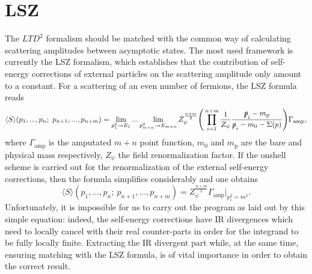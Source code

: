 \documentclass[11pt]{article}
\begin{document}
\section{LSZ}

The $LTD^2$ formalism should be matched with the common way of calculating scattering amplitudes between asymptotic states. The most used framework is currently the LSZ formalism, which establishes that the contribution of self-energy corrections of external particles on the scattering amplitude only amount to a constant. For a scattering of an even number of fermions, the LSZ formula reads
\begin{equation}
\langle S \rangle(p_1,...,p_n; \ p_{n+1},...,p_{n+m})=\lim_{p_1^0\rightarrow E_1}...\lim_{p_{m+n}^0\rightarrow E_{m+n}} Z_\psi^{\frac{n+m}{2}}\Bigg(\prod_{i=1}^{n+m}\frac{1}{Z_\psi}\frac{\slashed{p}_i -m_\text{p}}{\slashed{p}_i -m_0-\Sigma(p)}\Bigg)\Gamma_{\text{amp}},
\end{equation}
where $\Gamma_{\text{amp}}$ is the amputated $m+n$ point function, $m_0$ and $m_\text{p}$ are the bare and physical mass respectively, $Z_\psi$ the field renormalization factor.
If the onshell scheme is carried out for the renormalization of the external self-energy corrections, then the formula simplifies considerably and one obtains
\begin{equation}\label{lsz2}
\langle S \rangle(p_1,...,p_n; \ p_{n+1},...,p_{n+m})=Z_\psi^{\frac{n+m}{2}}\Gamma_{\text{amp}}\big|_{p_i^2=m^2}.
\end{equation}
Unfortunately, it is impossible for us to carry out the program as laid out by this simple equation: indeed, the self-energy corrections have IR divergences which need to locally cancel with their real counter-parts in order for the integrand to be fully locally finite. Extracting the IR divergent part while, at the same time, ensuring matching with the LSZ formula, is of vital importance in order to obtain the correct result. 
\end{document}
